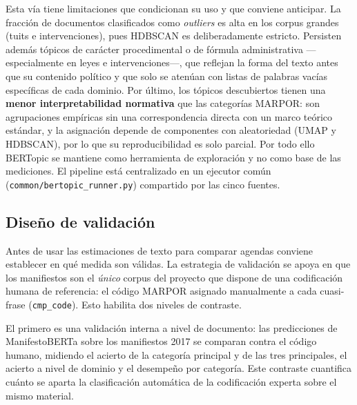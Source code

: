 Esta vía tiene limitaciones que condicionan su uso y que conviene anticipar. La
fracción de documentos clasificados como \emph{outliers} es alta en los corpus
grandes (tuits e intervenciones), pues HDBSCAN es deliberadamente estricto.
Persisten además tópicos de carácter procedimental o de fórmula
administrativa ---especialmente en leyes e intervenciones---, que reflejan la
forma del texto antes que su contenido político y que solo se atenúan con listas
de palabras vacías específicas de cada dominio. Por último, los tópicos
descubiertos tienen una \textbf{menor interpretabilidad normativa} que las
categorías MARPOR: son agrupaciones empíricas sin una correspondencia directa con
un marco teórico estándar, y la asignación depende de componentes con
aleatoriedad (UMAP y HDBSCAN), por lo que su reproducibilidad es solo parcial.
Por todo ello BERTopic se mantiene como herramienta de exploración y no como base
de las mediciones. El pipeline está centralizado en un ejecutor común
(\texttt{common/bertopic\_runner.py}) compartido por las cinco fuentes.

\subsection{Diseño de validación}
\label{sec:metodo-validacion}

Antes de usar las estimaciones de texto para comparar agendas conviene
establecer en qué medida son válidas. La estrategia de validación se apoya en
que los manifiestos son el \emph{único} corpus del proyecto que dispone de una
codificación humana de referencia: el código MARPOR asignado manualmente a cada
cuasi-frase (\texttt{cmp\_code}). Esto habilita dos niveles de contraste.

El primero es una validación interna a nivel de documento: las predicciones de
ManifestoBERTa sobre los manifiestos 2017 se comparan contra el código humano,
midiendo el acierto de la categoría principal y de las tres principales, el
acierto a nivel de dominio y el desempeño por categoría. Este contraste cuantifica
cuánto se aparta la clasificación automática de la codificación experta sobre el
mismo material.

